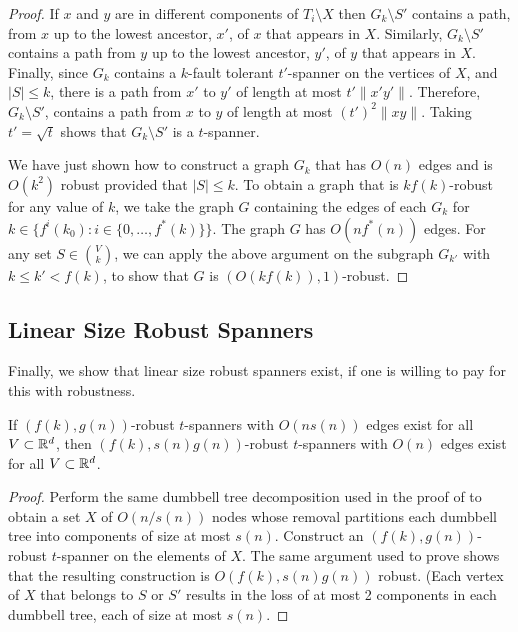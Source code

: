 \documentclass{patmorin}
\begin{document}
\begin{proof}
If $x$ and $y$ are in different components of $T_i\setminus X$ then
$G_k\setminus S'$ contains a path, from $x$ up to the lowest ancestor,
$x'$, of $x$ that appears in $X$.  Similarly, $G_k\setminus S'$ contains
a path from $y$ up to the lowest ancestor, $y'$, of $y$ that appears
in $X$.  Finally, since $G_k$ contains a $k$-fault tolerant $t'$-spanner
on the vertices of $X$, and $|S|\le k$, there is a path from $x'$ to
$y'$ of length at most $t'\|x'y'\|$.  Therefore, $G_k\setminus S'$,
contains a path from $x$ to $y$ of length at most $(t')^2\|xy\|$.
Taking $t'=\sqrt{t}$ shows that $G_k\setminus S'$ is a $t$-spanner.

We have just shown how to construct a graph $G_k$ that has $O(n)$ edges
and is $O(k^2)$ robust provided that $|S|\le k$.  To obtain a graph that
is $kf(k)$-robust for any value of $k$, we take the graph $G$ containing
the edges of each $G_k$ for $k\in\{f^i(k_0) : i\in\{0,\ldots,f^*(k)\}\}$.
The graph $G$ has $O(nf^*(n))$ edges.  For any set $S\in \binom{V}{k}$,
we can apply the above argument on the subgraph $G_{k'}$ with $k \le k'
< f(k)$, to show that $G$ is $(O(kf(k)),1)$-robust.
\end{proof}

\subsection{Linear Size Robust Spanners}

Finally, we show that linear size robust spanners exist, if one is willing
to pay for this with robustness.

\begin{thm}
If $(f(k),g(n))$-robust $t$-spanners with $O(n s(n))$ edges exist for all
$V\subset\mathbb{R}^d$, then $(f(k),s(n)g(n))$-robust $t$-spanners with $O(n)$
edges exist for all $V\subset\mathbb{R}^d$.
\end{thm}

\begin{proof}
Perform the same dumbbell tree decomposition used in the proof of
 to obtain a set $X$ of $O(n/s(n))$ nodes whose removal
partitions each dumbbell tree into components of size at most $s(n)$.
Construct an $(f(k),g(n))$-robust $t$-spanner on the elements of $X$.  The
same argument used to prove  shows that the resulting
construction is $O(f(k),s(n)g(n))$ robust.  (Each vertex of $X$ that
belongs to $S$ or $S'$ results in the loss of at most 2 components in each
dumbbell tree, each of size at most $s(n)$.
\end{proof}
\end{document}
